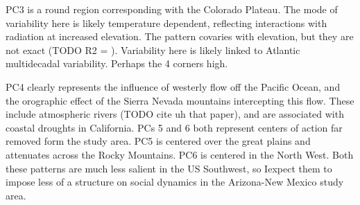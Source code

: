 \documentclass[fleqn,10pt]{wlscirep}
\begin{document}
PC3 is a round region corresponding with the Colorado Plateau. The mode of variability here is likely temperature dependent, reflecting interactions with radiation at increased elevation. The pattern covaries with elevation, but they are not exact (TODO R2 = ). Variability here is likely linked to Atlantic multidecadal variability. Perhaps the 4 corners high.

PC4 clearly represents the influence of westerly flow off the Pacific Ocean, and the orographic effect of the Sierra Nevada mountains intercepting this flow. These include atmospheric rivers (TODO cite uh that paper), and are associated with coastal droughts in California. PCs 5 and 6 both represent centers of action far removed form the study area. PC5 is centered over the great plains and attenuates across the Rocky Mountains. PC6 is centered in the North West. Both these patterns are much less salient in the US Southwest, so Iexpect them to impose less of a structure on social dynamics in the Arizona-New Mexico study area.




\end{document}
